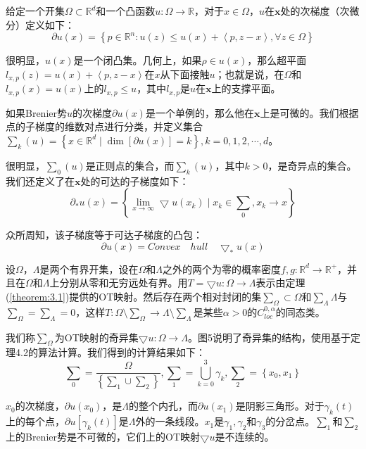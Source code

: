 \begin{definition}[次梯度]\label{definition:3.7}
	给定一个开集$\Omega \subset \mathbb{R}^d$和一个凸函数$u: \Omega \to \mathbb{R}$，对于$x \in \Omega$，$u$在$\mathbf{x}$处的次梯度（次微分）定义如下：
	\begin{equation*}
		\partial u(x)=\left \{ p \in \mathbb{R}^n : u(z) \le u(x) + \left \langle p,z-x \right \rangle , \forall z \in \Omega \right \}    
	\end{equation*}
	
	很明显，$u(x)$是一个闭凸集。几何上，如果$\rho \in u(x)$，那么超平面$l_{x,p}(z)=u(x)+\left \langle p,z-x \right \rangle $在$x$从下面接触$u$；也就是说，在$\Omega$和$l_{x,p}(x)=u(x)$上的$l_{x,p} \le u$，其中$l_{x,p}$是$u$在$\mathbf{x}$上的支撑平面。
	
	如果Brenier势$u$的次梯度$\partial u(x)$是一个单例的，那么他在$\mathbf{x}$上是可微的。我们根据点的子梯度的维数对点进行分类，并定义集合 $\sum _k (u) =\left \{ x \in \mathbb{R}^d \mid \dim \left [ \partial u(x) \right ] =k  \right \} ,k=0,1,2,\cdots ,d$。
	
	很明显，$\sum _0(u)$是正则点的集合，而$\sum _k(u)$，其中$k>0$，是奇异点的集合。我们还定义了在$\mathbf{x}$处的可达的子梯度如下：
	\begin{equation*}
		\partial _* u(x)=\left \{ \lim_{x \to \infty} \bigtriangledown u(x_k) \mid x_k \in \sum _0, x_k \to x \right \}    
	\end{equation*}

	众所周知，该子梯度等于可达子梯度的凸包：
	\begin{equation*}
		\partial u(x)=Convex \quad hull \quad \bigtriangledown _* u(x)
	\end{equation*}
\end{definition}

\begin{theorem}[规律性]\label{theorem:3.5}
	设$\Omega$，$\Lambda$是两个有界开集，设在$\Omega$和$\Lambda$之外的两个为零的概率密度$f,g : \mathbb{R}^d \to \mathbb{R} ^+$，并且在$\Omega$和$\Lambda$上分别从零和无穷远处有界。用$T=\bigtriangledown u: \Omega \to \Lambda$表示由定理(\ref{theorem:3.1})提供的OT映射。然后存在两个相对封闭的集$\sum _{\Omega} \subset \Omega$和$\sum _{\Lambda} \Lambda$与$\sum _{\Omega} = \sum _{\Lambda} =0$，这样$T: \Omega \setminus \sum _{\Omega} \to \Lambda \setminus \sum _{\Lambda}$是某些$\alpha > 0$的$C_{loc}^{0,\alpha}$的同态类。
	
	我们称$\sum_{\Omega}$为OT映射的奇异集$\bigtriangledown u : \Omega \to \Lambda$。图5说明了奇异集的结构，使用基于定理4.2的算法计算。我们得到的计算结果如下：
	\begin{equation*}
		\sum _0 = \frac{\Omega}{\left \{ \sum _1 \cup \sum _2 \right \}} , \sum _1=\bigcup_{k=0}^{3} \gamma _k, \sum _2=\left \{ x_0,x_1 \right \}    
	\end{equation*}
	
	$x_0$的次梯度，$\partial u(x_0)$，是$\Lambda$的整个内孔，而$\partial u(x_1)$是阴影三角形。对于$\gamma _k (t)$上的每个点，$\partial u \left [ \gamma_k(t) \right ]$是$\Lambda$外的一条线段。$x_1$是$\gamma_1,\gamma_2$和$\gamma_3$的分岔点。$\sum_1$和$\sum_2$上的Brenier势是不可微的，它们上的OT映射$\bigtriangledown u$是不连续的。
\end{theorem}